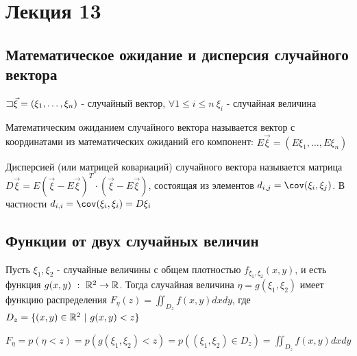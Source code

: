 \documentclass[12pt]{article}
\begin{document}
    \section{Лекция 13}

    \subsection{Математическое ожидание и дисперсия случайного вектора}
    
    $\mathord{\sqsupset} \vec{\xi} = (\xi_1, \dots, \xi_n)$ - случайный вектор, 
    $\forall 1 \leq i \leq n \ \xi_i$ - случайная величина

    \Def Математическим ожиданием случайного вектора называется вектор с координатами 
    из математических ожиданий его компонент: $E\vec{\xi} = (E\xi_1, \dots, E\xi_n)$

    \Def Дисперсией (или матрицей ковариаций) случайного вектора называется матрица
    $D\vec{\xi} = E(\vec{\xi} - E\vec{\xi})^T \cdot (\vec{\xi} - E\vec{\xi})$, состоящая
    из элементов $d_{i, j} = \cov (\xi_i, \xi_j)$. В частности $d_{i, i} = \cov (\xi_i, \xi_i) = D\xi_i$

    \subsection{Функции от двух случайных величин}

    \begin{MyTheorem}
        \Ths Пусть $\xi_1, \xi_2$ - случайные величины с общем плотностью $f_{\xi_1, \xi_2}(x, y)$, и есть функция
        $g(x, y) \ : \ \mathbb{R}^2 \rightarrow \mathbb{R}$. Тогда случайная величина $\eta = g(\xi_1, \xi_2)$ имеет
        функцию распределения $F_{\eta}(z) = \iint_{D_z} f(x, y)dxdy$, 
        где $D_z = \{(x, y) \in \mathbb{R}^2 \ | \ g(x, y) < z\}$
    \end{MyTheorem}

    \begin{MyProof}
        $F_\eta = p(\eta < z) = p(g(\xi_1, \xi_2) < z) = p((\xi_1, \xi_2) \in D_z) = \iint_{D_z} f(x, y) dxdy$
    \end{MyProof}
\end{document}
